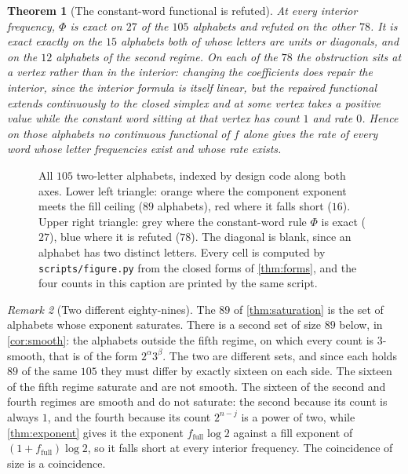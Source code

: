\documentclass[11pt]{amsart}
\newtheorem{theorem}{Theorem}[section]
\theoremstyle{definition}
\theoremstyle{remark}
\newtheorem{remark}[theorem]{Remark}
\newcommand{\fpy}{\texttt{scripts/\allowbreak figure.py}}
\begin{document}
\begin{theorem}[The constant-word functional is refuted]
\label{thm:phi}
At every interior frequency, $\Phi$ is exact on $27$ of the $105$ alphabets and refuted on the other $78$. It is exact exactly on the $15$ alphabets both of whose letters are units or diagonals, and on the $12$ alphabets of the second regime. On each of the $78$ the obstruction sits at a vertex rather than in the interior: changing the coefficients does repair the interior, since the interior formula is itself linear, but the repaired functional extends continuously to the closed simplex and at some vertex takes a positive value while the constant word sitting at that vertex has count $1$ and rate $0$. Hence on those alphabets no continuous functional of $f$ alone gives the rate of every word whose letter frequencies exist and whose rate exists.
\end{theorem}

\begin{figure}[!ht]
\centering
\ledgerplate
\caption{All $105$ two-letter alphabets, indexed by design code along both axes. Lower left triangle: orange where the component exponent meets the fill ceiling ($89$ alphabets), red where it falls short ($16$). Upper right triangle: grey where the constant-word rule $\Phi$ is exact ($27$), blue where it is refuted ($78$). The diagonal is blank, since an alphabet has two distinct letters. Every cell is computed by \fpy{} from the closed forms of \cref{thm:forms}, and the four counts in this caption are printed by the same script.}
\label{fig:ledger}
\end{figure}

\begin{remark}[Two different eighty-nines]
\label{rem:two89}
The $89$ of \cref{thm:saturation} is the set of alphabets whose exponent saturates. There is a second set of size $89$ below, in \cref{cor:smooth}: the alphabets outside the fifth regime, on which every count is $3$-smooth, that is of the form $2^\alpha 3^\beta$. The two are different sets, and since each holds $89$ of the same $105$ they must differ by exactly sixteen on each side. The sixteen of the fifth regime saturate and are not smooth. The sixteen of the second and fourth regimes are smooth and do not saturate: the second because its count is always $1$, and the fourth because its count $2^{n-j}$ is a power of two, while \cref{thm:exponent} gives it the exponent $f_{\text{full}}\log 2$ against a fill exponent of $(1+f_{\text{full}})\log 2$, so it falls short at every interior frequency. The coincidence of size is a coincidence.
\end{remark}
\end{document}
